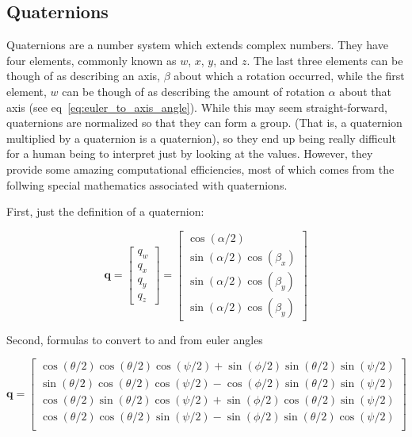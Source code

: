 \documentclass[paper=a4, fontsize=11pt]{scrartcl} %
\numberwithin{equation}{section} %
\numberwithin{figure}{section} %
\numberwithin{table}{section} %
\begin{document}
\subsection{Quaternions}

Quaternions are a number system which extends complex numbers.  They have four elements, commonly known as $w$, $x$, $y$, and $z$.  The last three elements can be though of as describing an axis, $\beta$ about which a rotation occurred, while the first element, $w$ can be though of as describing the amount of rotation $\alpha$ about that axis (see eq~\ref{eq:euler_to_axis_angle}).  While this may seem straight-forward, quaternions are normalized so that they can form a group.  (That is, a quaternion multiplied by a quaternion is a quaternion), so they end up being really difficult for a human being to interpret just by looking at the values.  However, they provide some amazing computational efficiencies, most of which comes from the follwing special mathematics associated with quaternions.  

First, just the definition of a quaternion:

\begin{equation}
	\bm{q} = \begin{bmatrix}
				q_w \\
				q_x \\
				q_y \\
				q_z 
			 \end{bmatrix} 
		   = \begin{bmatrix}
				\cos(\alpha/2) \\
				\sin(\alpha/2)\cos(\beta_x) \\
				\sin(\alpha/2)\cos(\beta_y) \\
				\sin(\alpha/2)\cos(\beta_y) 
			 \end{bmatrix}
	\label{eq:euler_to_axis_angle}
\end{equation}

Second, formulas to convert to and from euler angles

\begin{equation}
	\bm{q} = 
	  \begin{bmatrix}
	  	\cos(\theta/2)\cos(\theta/2)\cos(\psi/2) + \sin(\phi/2)\sin(\theta/2)\sin(\psi/2) \\
	  	\sin(\theta/2)\cos(\theta/2)\cos(\psi/2) - \cos(\phi/2)\sin(\theta/2)\sin(\psi/2) \\
	  	\cos(\theta/2)\sin(\theta/2)\cos(\psi/2) + \sin(\phi/2)\cos(\theta/2)\sin(\psi/2) \\
	  	\cos(\theta/2)\cos(\theta/2)\sin(\psi/2) - \sin(\phi/2)\sin(\theta/2)\cos(\psi/2) \\
	  \end{bmatrix}
\end{equation}
\end{document}
